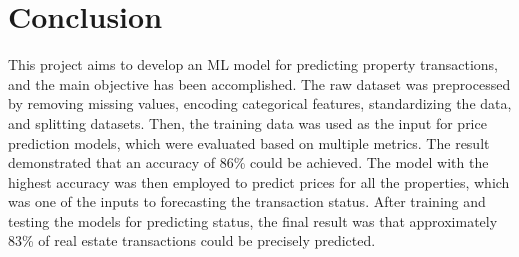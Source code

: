 \documentclass[12pt,twoside]{report}
\begin{document}
\section{Conclusion}
This project aims to develop an ML model for predicting property transactions, and the main objective has been accomplished. The raw dataset was preprocessed by removing missing values, encoding categorical features, standardizing the data, and splitting datasets. Then, the training data was used as the input for price prediction models, which were evaluated based on multiple metrics. The result demonstrated that an accuracy of 86\% could be achieved. The model with the highest accuracy was then employed to predict prices for all the properties, which was one of the inputs to forecasting the transaction status. After training and testing the models for predicting status, the final result was that approximately 83\% of real estate transactions could be precisely predicted. 



\end{document}
